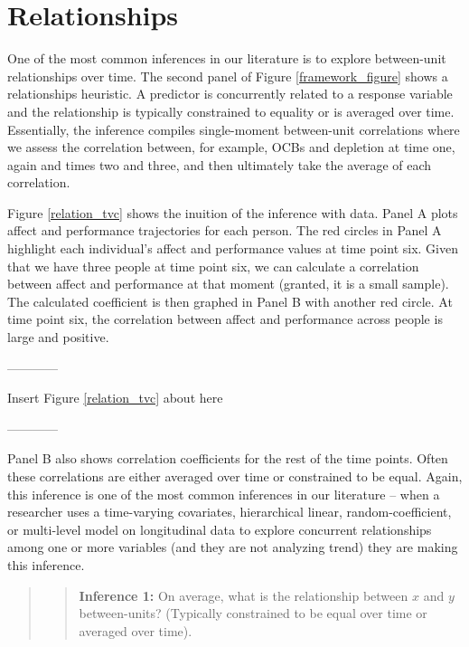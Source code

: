 \documentclass[english,,man]{apa6}
\theoremstyle{definition}
\theoremstyle{definition}
\theoremstyle{definition}
\theoremstyle{remark}
\begin{document}
\hypertarget{relationships}{%
\section{Relationships}\label{relationships}}

One of the most common inferences in our literature is to explore
between-unit relationships over time. The second panel of Figure
\ref{framework_figure} shows a relationships heuristic. A predictor is
concurrently related to a response variable and the relationship is
typically constrained to equality or is averaged over time. Essentially,
the inference compiles single-moment between-unit correlations where we
assess the correlation between, for example, OCBs and depletion at time
one, again and times two and three, and then ultimately take the average
of each correlation.

Figure \ref{relation_tvc} shows the inuition of the inference with data.
Panel A plots affect and performance trajectories for each person. The
red circles in Panel A highlight each individual's affect and
performance values at time point six. Given that we have three people at
time point six, we can calculate a correlation between affect and
performance at that moment (granted, it is a small sample). The
calculated coefficient is then graphed in Panel B with another red
circle. At time point six, the correlation between affect and
performance across people is large and positive.

\begin{center}

------------

Insert Figure \ref{relation_tvc} about here

------------

\end{center}

Panel B also shows correlation coefficients for the rest of the time
points. Often these correlations are either averaged over time or
constrained to be equal. Again, this inference is one of the most common
inferences in our literature -- when a researcher uses a time-varying
covariates, hierarchical linear, random-coefficient, or multi-level
model on longitudinal data to explore concurrent relationships among one
or more variables (and they are not analyzing trend) they are making
this inference.

\begin{quote}
\begin{quote}
\textbf{Inference 1:} On average, what is the relationship between \(x\)
and \(y\) between-units? (Typically constrained to be equal over time or
averaged over time).
\end{quote}
\end{quote}
\end{document}
